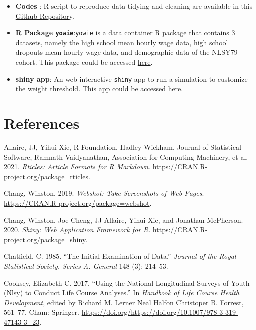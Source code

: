 \documentclass{article}
\begin{document}
\begin{itemize}
\item
  \textbf{Codes} : R script to reproduce data tidying and cleaning are available in this \href{https://github.com/numbats/yowie/blob/master/data-raw/data_preprocessing.R}{Github Repository}.
\item
  \textbf{R Package \texttt{yowie}}:\texttt{yowie} is a data container R package that contains 3 datasets, namely the high school mean hourly wage data, high school dropouts mean hourly wage data, and demographic data of the NLSY79 cohort. This package could be accessed \href{https://github.com/numbats/yowie}{here}.
\item
  \textbf{shiny app}: An web interactive \texttt{shiny} app to run a simulation to customize the weight threshold. This app could be accessed \href{https://github.com/numbats/summer-wages-refresh/tree/main/app}{here}.
\end{itemize}

\hypertarget{references}{%
\section*{References}\label{references}}

\hypertarget{refs}{}
\leavevmode\hypertarget{ref-rticles}{}%
Allaire, JJ, Yihui Xie, R Foundation, Hadley Wickham, Journal of Statistical Software, Ramnath Vaidyanathan, Association for Computing Machinery, et al. 2021. \emph{Rticles: Article Formats for R Markdown}. \url{https://CRAN.R-project.org/package=rticles}.

\leavevmode\hypertarget{ref-webshot}{}%
Chang, Winston. 2019. \emph{Webshot: Take Screenshots of Web Pages}. \url{https://CRAN.R-project.org/package=webshot}.

\leavevmode\hypertarget{ref-shiny}{}%
Chang, Winston, Joe Cheng, JJ Allaire, Yihui Xie, and Jonathan McPherson. 2020. \emph{Shiny: Web Application Framework for R}. \url{https://CRAN.R-project.org/package=shiny}.

\leavevmode\hypertarget{ref-Chatfield1985TIEo}{}%
Chatfield, C. 1985. ``The Initial Examination of Data.'' \emph{Journal of the Royal Statistical Society. Series A. General} 148 (3): 214--53.

\leavevmode\hypertarget{ref-eliznlsy}{}%
Cooksey, Elizabeth C. 2017. ``Using the National Longitudinal Surveys of Youth (Nlsy) to Conduct Life Course Analyses.'' In \emph{Handbook of Life Course Health Development}, edited by Richard M. Lerner Neal Halfon Christoper B. Forrest, 561--77. Cham: Springer. \url{https://doi.org/https://doi.org/10.1007/978-3-319-47143-3_23}.
\end{document}
